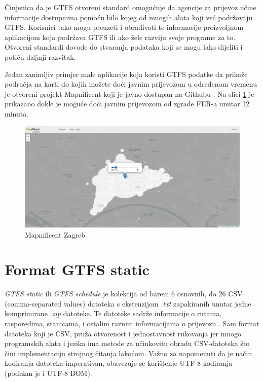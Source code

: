 \documentclass[zavrsnirad]{fer}
\begin{document}
Činjenica da je GTFS otvoreni standard omogućuje da agencije za prijevoz učine informacije dostupnima pomoću bilo kojeg od mnogih alata koji već podržavaju GTFS. Korisnici tako mogu preuzeti i obrađivati te informacije proizvoljnom aplikacijom koja podržava GTFS ili ako žele razviju svoje programe za to. Otvoreni standardi dovode do stvaranja podataka koji se mogu lako dijeliti i potiču daljnji razvitak.

Jedan zanimljiv primjer male aplikacije koja koristi GTFS podatke da prikaže područja na karti do kojih možete doći javnim prijevozom u određenom vremenu je otvoreni projekt Mapnificent koji je javno dostupan na Githubu \cite{Mapnificent}. Na slici \ref{slk:mapnificent-zagreb} je prikazano dokle je moguće doći javnim prijevozom od zgrade FER-a unutar 12 minuta. 

\begin{figure}[htb]
  \centering
  \includegraphics[width=0.9\linewidth]{Figures/mapnificent-zagreb.jpg} 
  \caption{Mapnificent Zagreb}
  \label{slk:mapnificent-zagreb}
\end{figure}
\newpage
\section{Format GTFS static}

\textit{GTFS static} ili \textit{GTFS schedule} je kolekcija od barem 6 osnovnih, do 26 CSV (comma-separated
values) datoteka s ekstenzijom \textit{.txt} zapakiranih unutar jedne komprimirane \textit{.zip} datoteke. Te datoteke
sadrže informacije o rutama, rasporedima, stanicama, i ostalim raznim informacijama o prijevozu \cite{GTFS-schedule}. Sam format datoteka koji je CSV, pruža otvorenost i jednostavnost rukovanja jer mnogo programskih alata i jezika ima metode za učinkovitu obradu CSV-datoteka što čini implementaciju strojnog čitanja lakoćom. Važno za napomenuti da je način kodiranja datoteka imperativan, obavezuje se korištenje UTF-8 kodiranja (podržan je i UTF-8 BOM).
\end{document}

